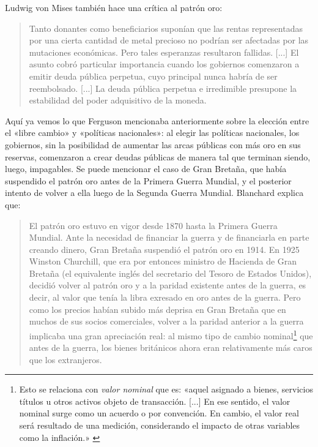 \documentclass[12pt,a4paper,twoside]{book}
\begin{document}
Ludwig von Mises también hace una crítica al patrón oro:

\begin{quotation}
Tanto donantes como beneficiarios suponían que las rentas representadas por una cierta cantidad de metal precioso no podrían ser afectadas por las mutaciones económicas. Pero tales esperanzas resultaron fallidas. [...] El asunto cobró particular importancia cuando los gobiernos comenzaron a emitir deuda pública perpetua, cuyo principal nunca habría de ser reembolsado. [...] La deuda pública perpetua e irredimible presupone la estabilidad del poder adquisitivo de la moneda. \cite[págs. 272-273]{mises:lah}
\end{quotation}

Aquí ya vemos lo que Ferguson mencionaba anteriormente sobre la elección entre el «libre cambio» y «políticas nacionales»: al elegir las políticas nacionales, los gobiernos, sin la posibilidad de aumentar las arcas públicas con más oro en sus reservas, comenzaron a crear deudas públicas de manera tal que terminan siendo, luego, impagables. Se puede mencionar el caso de Gran Bretaña, que había suspendido el patrón oro antes de la Primera Guerra Mundial, y el posterior intento de volver a ella luego de la Segunda Guerra Mundial. Blanchard explica que:

\begin{quotation}
El patrón oro estuvo en vigor desde 1870 hasta la Primera Guerra Mundial. Ante la necesidad de financiar la guerra y de financiarla en parte creando dinero, Gran Bretaña suspendió el patrón oro en 1914. En 1925 Winston Churchill, que era por entonces ministro de Hacienda de Gran Bretaña (el equivalente inglés del secretario del Tesoro de Estados Unidos), decidió volver al patrón oro y a la paridad existente antes de la guerra, es decir, al valor que tenía la libra exresado en oro antes de la guerra. Pero como los precios habían subido más deprisa en Gran Bretaña que en muchos de sus socios comerciales, volver a la paridad anterior a la guerra implicaba una gran apreciación real: al mismo tipo de cambio nominal\footnote{Esto se relaciona con \textit{valor nominal} que es: «aquel asignado a bienes, servicios títulos u otros activos objeto de transacción. [...] En ese sentido, el valor nominal surge como un acuerdo o por convención. En cambio, el valor real será resultado de una medición, considerando el impacto de otras variables como la inflación.» \cite{epedia:nominal}} que antes de la guerra, los bienes británicos ahora eran relativamente más caros que los extranjeros. \cite[pág. 441]{blanchard}
\end{quotation}
\end{document}

